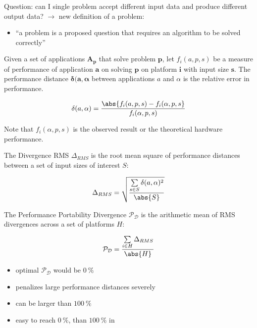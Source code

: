 Question: can I single problem accept different input data and produce different output data? $\rightarrow$ new definition of a problem:
\begin{itemize}
    \item \enquote{a problem is a proposed question that requires an algorithm to be solved correctly}
\end{itemize}

\begin{definition}\label{def:perf_dist}
Given a set of applications $\mathbf{A_p}$ that solve problem $\mathbf{p}$, let $f_i(a, p, s)$ be a measure of performance of application $\mathbf{a}$ on solving $\mathbf{p}$ on platform $\mathbf{i}$ with input size $\mathbf{s}$. 
The performance distance $\mathbf{\delta(a, \alpha}$ between applications $a$ and $\alpha$ is the relative error in performance.

$$\delta(a, \alpha) = \frac{\abs{f_i(a, p, s) - f_i(\alpha, p, s}}{f_i(\alpha, p, s)}$$

Note that $f_i(\alpha, p, s)$ is the observed result or the theoretical hardware performance. 
\end{definition}

\begin{definition}\label{def:div_rms}
The Divergence RMS $\Delta_{RMS}$ is the root mean square of performance distances between a set of input sizes of interest $S$:

$$\Delta_{RMS} = \sqrt{\frac{\sum\limits_{s \in S} \delta(a, \alpha)^2}{\abs{S}}}$$

\end{definition}

\begin{definition}\label{def:pp_div}
The Performance Portability Divergence $\mathcal{P_D}$ is the arithmetic mean of RMS divergences across a set of platforms $H$:

$$\mathcal{P_D} = \frac{\sum\limits_{i \in H} \Delta_{RMS}}{\abs{H}}$$

\end{definition}

\begin{itemize}
    \item optimal $\mathcal{P_D}$ would be $\SI{0}{\percent}$
    \item penalizes large performance distances severely
    \item can be larger than $\SI{100}{\percent}$
    \item easy to reach $\SI{0}{\percent}$, than $\SI{100}{\percent}$ in \pp
\end{itemize}


